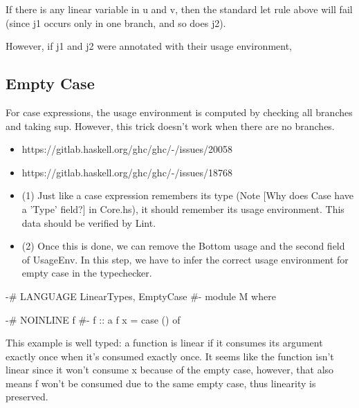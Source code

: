 \documentclass[a4paper, draft]{report}
\begin{document}
If there is any linear variable in u and v, then the standard
let rule above will fail (since j1 occurs only in one branch, and
so does j2).

However, if j1 and j2 were annotated with their usage environment,

\subsection{Empty Case}

For case expressions, the usage environment is computed by checking all branches
and taking sup. However, this trick doesn't work when there are no branches.

\begin{itemize}
\item https://gitlab.haskell.org/ghc/ghc/-/issues/20058
\item https://gitlab.haskell.org/ghc/ghc/-/issues/18768

\item (1) Just like a case expression remembers its type (Note [Why does Case have a
'Type' field?] in Core.hs), it should remember its usage environment. This data
should be verified by Lint.

\item (2) Once this is done, we can remove the Bottom usage and the second field of
UsageEnv. In this step, we have to infer the correct usage environment for empty
case in the typechecker.
\end{itemize}

\begin{code}
{-# LANGUAGE LinearTypes, EmptyCase #-}
module M where

{-# NOINLINE f #-}
f :: a %
f x = case () of {}
\end{code}

This example is well typed: a function is linear if it consumes its argument
exactly once when it's consumed exactly once. It seems like the function isn't
linear since it won't consume x because of the empty case, however, that also
means f won't be consumed due to the same empty case, thus linearity is
preserved.

\end{document}
